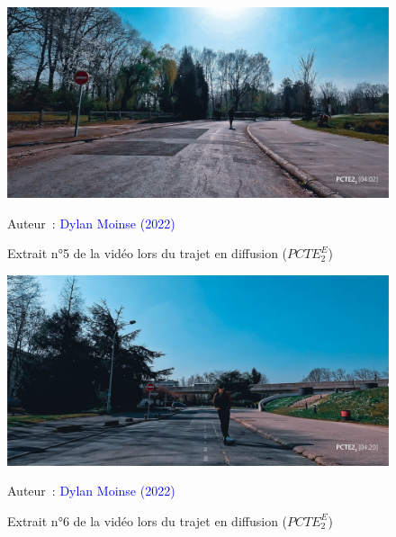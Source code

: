     \begin{figure}[h!]\vspace*{4pt}
        \caption*{Extrait n°5 de la vidéo lors du trajet en diffusion (\(PCTE^{E}_{2}\))}
        \centerline{\includegraphics[width=0.75\columnwidth]{src/Figures/Annexes/Extrait_Video_PCTE2_Egress_5.jpg}}
        \vspace{5pt}
        \begin{flushright}\scriptsize{
        Auteur~: \textcolor{blue}{Dylan Moinse (2022)}
        }\end{flushright}
    \end{figure}

    \begin{figure}[h!]\vspace*{4pt}
        \caption*{Extrait n°6 de la vidéo lors du trajet en diffusion (\(PCTE^{E}_{2}\))}
        \centerline{\includegraphics[width=0.75\columnwidth]{src/Figures/Annexes/Extrait_Video_PCTE2_Egress_6.jpg}}
        \vspace{5pt}
        \begin{flushright}\scriptsize{
        Auteur~: \textcolor{blue}{Dylan Moinse (2022)}
        }\end{flushright}
    \end{figure}


